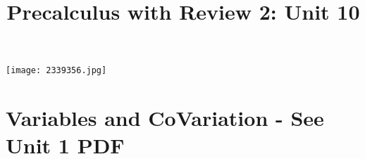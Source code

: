 \documentclass[handout]{xourse}
\title{Precalculus with Review 2: Unit 10}
\begin{document}
\texttt{[image: 2339356.jpg]}
\maketitle


	





\part{Variables and CoVariation - See Unit 1 PDF}  %
%
%
%
%
%
%
%
%
\end{document}
